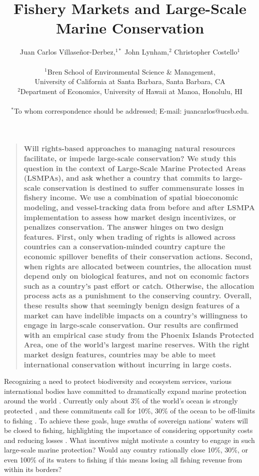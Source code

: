 \documentclass[12pt]{article}
\title{Fishery Markets and Large-Scale Marine Conservation}
\author{Juan Carlos Villase\~{n}or-Derbez,$^{1\ast}$ John Lynham,$^{2}$ Christopher Costello$^{1}$\\
\\
\normalsize{$^{1}$Bren School of Environmental Science \& Management,}\\
\normalsize{University of California at Santa Barbara, Santa Barbara, CA}\\
\normalsize{$^{2}$Department of Economics, University of Hawaii at Manoa, Honolulu, HI}\\
\\
\normalsize{$^\ast$To whom correspondence should be addressed; E-mail: juancarlos@ucsb.edu.}
}
\date{}
\newenvironment{sciabstract}{%
\begin{quote} \bf}
{\end{quote}}
\begin{document}

\baselineskip24pt


\maketitle



\begin{sciabstract}
Will rights-based approaches to managing natural resources facilitate, or impede large-scale conservation? We study this question in the context of Large-Scale Marine Protected Areas (LSMPAs), and ask whether a country that commits to large-scale conservation is destined to suffer commensurate losses in fishery income. We use a combination of spatial bioeconomic modeling, and vessel-tracking data from before and after LSMPA implementation to assess how market design incentivizes, or penalizes conservation. The answer hinges on two design features. First, only when trading of rights is allowed across countries can a conservation-minded country capture the economic spillover benefits of their conservation actions. Second, when rights are allocated between countries, the allocation must depend only on biological features, and not on economic factors such as a country's past effort or catch. Otherwise, the allocation process acts as a punishment to the conserving country. Overall, these results show that seemingly benign design features of a market can have indelible impacts on a country's willingness to engage in large-scale conservation. Our results are confirmed with an empirical case study from the Phoenix Islands Protected Area, one of the world's largest marine reserves. With the right market design features, countries may be able to meet international conservation without incurring in large costs.
\end{sciabstract}

Recognizing a need to protect biodiversity and ecosystem services, various international bodies have committed to dramatically expand marine protection around the world \cite{dinerstein_2019}. Currently only about 3\% of the world's ocean is strongly protected \cite{sala_2018}, and these commitments call for 10\%, 30\% of the ocean to be off-limits to fishing \cite{oleary_2016,dinerstein_2019}. To achieve these goals, huge swaths of sovereign nations' waters will be closed to fishing, highlighting the importance of considering opportunity costs and reducing losses \cite{smith_2010,mallin_2019}. What incentives might motivate a country to engage in such large-scale marine protection? Would any country rationally close 10\%, 30\%, or even 100\% of its waters to fishing if this means losing all fishing revenue from within its borders?
\end{document}
